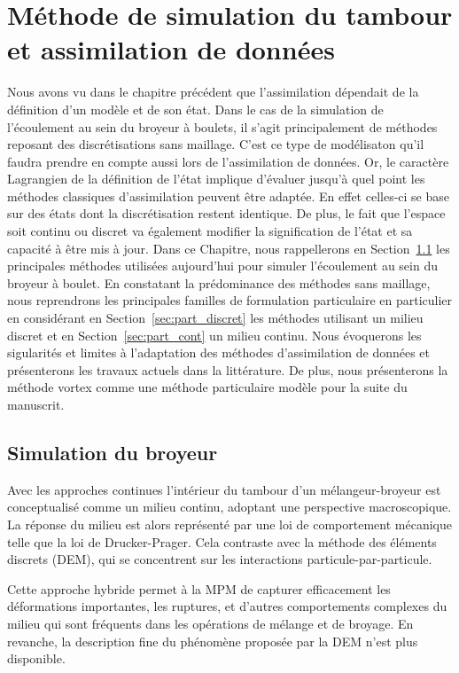 
\chapter{Méthode de simulation du tambour et assimilation de données}

Nous avons vu dans le chapitre précédent que l'assimilation dépendait de la définition d'un modèle et de son état. Dans le cas de la simulation de l'écoulement au sein du broyeur à boulets, il s'agit principalement de méthodes reposant des discrétisations sans maillage. C'est ce type de modélisaton qu'il faudra prendre en compte aussi lors de l'assimilation de données. Or, le caractère Lagrangien de la définition de l'état implique d'évaluer jusqu'à quel point les méthodes classiques d'assimilation peuvent être adaptée. En effet celles-ci se base sur des états dont la discrétisation restent identique. De plus, le fait que l'espace soit continu ou discret va également modifier la signification de l'état et sa capacité à être mis à jour.
Dans ce Chapitre, nous rappellerons en Section~\ref{sec:simu_broyeur} les principales méthodes utilisées aujourd'hui pour simuler l'écoulement au sein du broyeur à boulet. En constatant la prédominance des méthodes sans maillage, nous reprendrons les principales familles de formulation particulaire en particulier en considérant en Section~\ref{sec:part_discret} les méthodes utilisant un milieu discret et en Section~\ref{sec:part_cont} un milieu continu. Nous évoquerons les sigularités et limites à l'adaptation des méthodes d'assimilation de données et présenterons les travaux actuels dans la littérature. De plus, nous présenterons la méthode vortex comme une méthode particulaire modèle pour la suite du manuscrit.

\section{Simulation du broyeur}\label{sec:simu_broyeur}

Avec les approches continues l'intérieur du tambour d'un mélangeur-broyeur est conceptualisé comme un milieu continu, adoptant une perspective macroscopique. La réponse du milieu est alors représenté par une loi de comportement mécanique telle que la loi de Drucker-Prager. Cela contraste avec la méthode des éléments discrets (DEM), qui se concentrent sur les interactions particule-par-particule.

Cette approche hybride permet à la MPM de capturer efficacement les déformations importantes, les ruptures, et d'autres comportements complexes du milieu qui sont fréquents dans les opérations de mélange et de broyage. En revanche, la description fine du phénomène proposée par la DEM n'est plus disponible.

